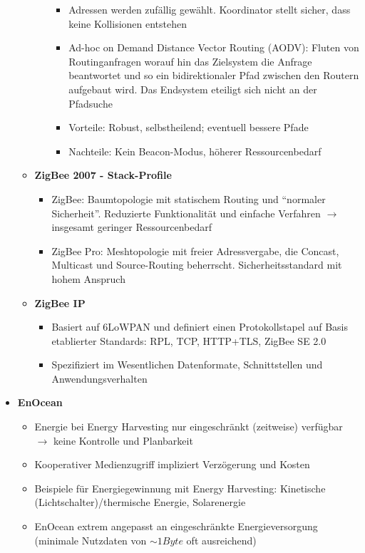 \begin{itemize}
\begin{itemize}
\begin{itemize}
\begin{itemize}
				\item Adressen werden zufällig gewählt. Koordinator stellt sicher, dass keine Kollisionen entstehen
				\item Ad-hoc on Demand Distance Vector Routing (AODV): Fluten von Routinganfragen worauf hin das Zielsystem die Anfrage beantwortet und so ein bidirektionaler Pfad zwischen den Routern aufgebaut wird. Das Endsystem eteiligt sich nicht an der Pfadsuche
				\item Vorteile: Robust, selbstheilend; eventuell bessere Pfade
				\item Nachteile: Kein Beacon-Modus, höherer Ressourcenbedarf
			\end{itemize}
		\end{itemize}
		\item \textbf{ZigBee 2007 - Stack-Profile}
		\begin{itemize}
			\item ZigBee: Baumtopologie mit statischem Routing und "`normaler Sicherheit"'. Reduzierte Funktionalität und einfache Verfahren \(\rightarrow\) insgesamt geringer Ressourcenbedarf
			\item ZigBee Pro: Meshtopologie mit freier Adressvergabe, die Concast, Multicast und Source-Routing beherrscht. Sicherheitsstandard mit hohem Anspruch
		\end{itemize}
		\item \textbf{ZigBee IP}
		\begin{itemize}
			\item Basiert auf 6LoWPAN und definiert einen Protokollstapel auf Basis etablierter Standards: RPL, TCP, HTTP+TLS, ZigBee SE 2.0
			\item Spezifiziert im Wesentlichen Datenformate, Schnittstellen und Anwendungsverhalten
		\end{itemize}
	\end{itemize}
	\item \textbf{EnOcean}
	\begin{itemize}
		\item Energie bei Energy Harvesting nur eingeschränkt (zeitweise) verfügbar \(\rightarrow\) keine Kontrolle und Planbarkeit
		\item Kooperativer Medienzugriff impliziert Verzögerung und Kosten
		\item Beispiele für Energiegewinnung mit Energy Harvesting: Kinetische (Lichtschalter)/thermische Energie, Solarenergie
		\item EnOcean extrem angepasst an eingeschränkte Energieversorgung (minimale Nutzdaten von \(\sim 1 Byte\) oft ausreichend)
	\end{itemize}
\end{itemize}

